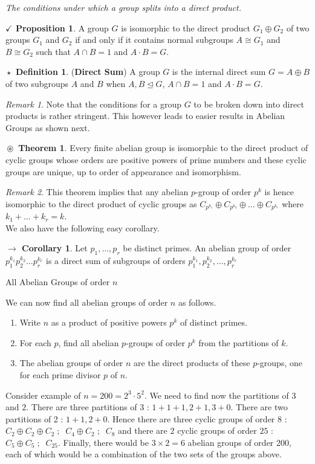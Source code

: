 \documentclass{article}
\theoremstyle{definition}
\newtheorem{definition}{$\boxed{\star}$ Definition}
\newtheorem{theorem}{$\boxed{\boxed{\circledast}}$ Theorem}
\theoremstyle{remark}
\newtheorem*{remark}{Remark}
\theoremstyle{definition}
\newtheorem{corollary}{$ \to $ Corollary}
\theoremstyle{definition}
\newtheorem{proposition}{$\checkmark$ Proposition}
\theoremstyle{definition}
\theoremstyle{proof}
\newcommand{\nsg}[0]{\trianglelefteq}
\newcommand{\isomorph}{\cong}
\begin{document}
\emph{The conditions under which a group splits into a direct product.}
\begin{proposition}
	A group $ G $ is isomorphic to the direct product $ G_1\oplus G_2 $ of two groups $ G_1 $ and $ G_2 $ if and only if it contains normal subgroups $ A\isomorph G_1 $ and $ B\isomorph G_2 $ such that $ A\cap B = 1$ and $ A\cdot B = G $.
\end{proposition}
\hrulefill
\begin{definition}
	(\textbf{Direct Sum}) A group $ G $ is the internal direct sum $ G = A\oplus B $ of two subgroups $ A $ and $ B $ when $ A,B \nsg G $, $ A\cap B = 1 $ and $ A\cdot B = G $.
\end{definition}
\begin{remark}
	Note that the conditions for a group $ G $ to be broken down into direct products is rather stringent. This however leads to easier results in Abelian Groups as shown next.
\end{remark}
\hrulefill
\begin{theorem}
	Every finite abelian group is isomorphic to the direct product of cyclic groups whose orders are positive powers of prime numbers and these cyclic groups are unique, up to order of appearance and isomorphism.
\end{theorem}
\begin{remark}
	This theorem implies that any abelian $ p $-group of order $ p^k $ is hence isomorphic to the direct product of cyclic groups as $ C_{p^{k_1}}\oplus C_{p^{k_2}} \oplus \dots \oplus C_{p^{k_r}} $ where $ k_1 + \dots + k_r = k $. \\
	We also have the following easy corollary.
\end{remark}
\begin{corollary}
	Let $ p_1,\dots,p_r $ be distinct primes. An abelian group of order $ p_1^{k_1}p_2^{k_2}\dots p_r^{k_r} $ is a direct sum of subgroups of orders $ p_1^{k_1},p_2^{k_2},\dots, p_r^{k_r}  $
\end{corollary}
\hrulefill
All Abelian Groups of order $ n $
\hrulefill

We can now find all abelian groups of order $ n $ as follows.
\begin{enumerate}
	\item {Write $ n $ as a product of positive powers $ p^k $ of distinct primes.}
	\item {For each $ p $, find all abelian $ p $-groups of order $ p^k $ from the partitions of $ k $.}
	\item {The abelian groups of order $ n $ are the direct products of these $ p $-groups, one for each prime divisor $ p $ of $ n $.}
\end{enumerate}
Consider example of $ n = 200 = 2^3\cdot 5^2 $. We need to find now the partitions of $ 3 $ and $ 2 $. There are three partitions of 3 : $ 1+1+1, 2+1, 3+0 $. There are two partitions of 2 : $ 1+1, 2+0 $. Hence there are three cyclic groups of order 8 : $ C_2\oplus C_2\oplus C_2\;;\;\;C_4\oplus C_2 \;;\;\;C_8$ and there are 2 cyclic groups of order $ 25 $ : $ C_5\oplus C_5\;;\;\;C_{25} $. Finally, there would be $ 3\times 2 = 6$ abelian groups of order 200, each of which would be a combination of the two sets of the groups above.
\end{document}

